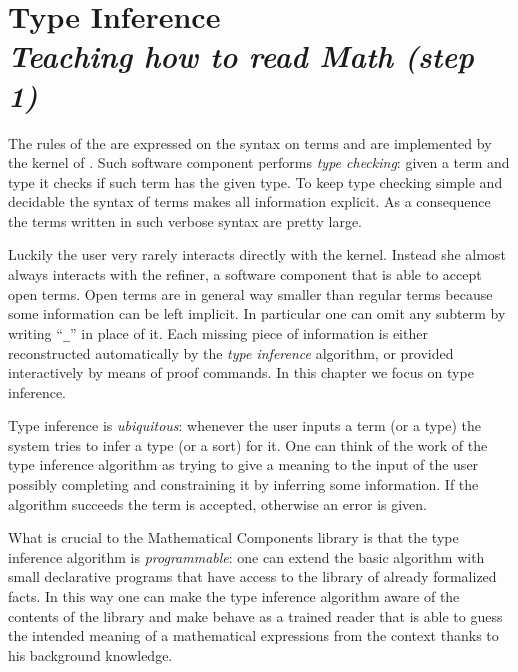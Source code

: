 \chapter[Type Inference]{Type Inference\\[2ex]\Large\itshape Teaching \Coq{}
how to read Math (step 1)}

The rules of the \mcbCIC{} are expressed on the syntax on terms and
are implemented by the kernel of \Coq{}.  Such software component
performs \emph{type checking}: given a term and type it checks if such
term has the given type.  To keep type checking simple and decidable
the syntax of terms makes all information explicit. As a consequence
the terms written in such verbose syntax are pretty large.

Luckily the user very rarely interacts directly with the kernel.
Instead she almost always interacts with the refiner, a software
component that is able to accept open terms.  Open terms are in
general way smaller than regular terms because some information can be
left implicit.  In particular one can omit any subterm by writing
``\lstinline/_/'' in place of it.
Each missing piece of information is either reconstructed
automatically by the \emph{type inference} algorithm, or provided
interactively by means of proof commands.  In this chapter we
focus on type inference.

Type inference is \emph{ubiquitous}: whenever the user inputs a term
(or a type) the system tries to infer a type (or
a sort) for it.  One can think of the work of the type inference
algorithm as trying to give a meaning to the input of the
user possibly completing and constraining it by inferring some
information.  If the algorithm succeeds the term is accepted,
otherwise an error is given.

What is crucial to the Mathematical Components library is that the
type inference algorithm is \emph{programmable}: one can extend the
basic algorithm with small declarative programs that have access to
the library of already formalized facts.  In this way one can make the
type inference algorithm aware of the contents of the library and
make \Coq{} behave as a trained reader that is able to guess the
intended meaning of a mathematical expressions from the context
thanks to his background knowledge.

